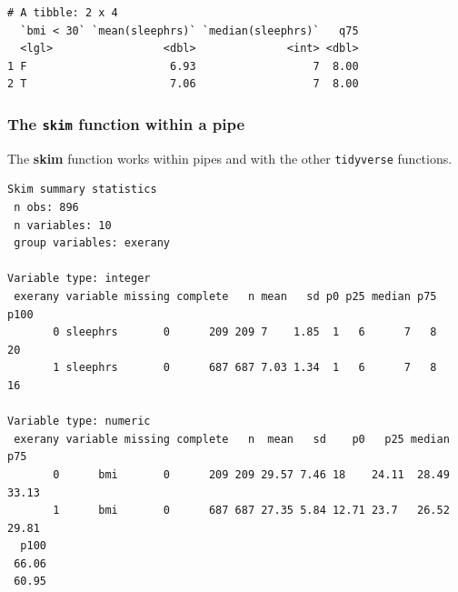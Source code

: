 \documentclass[]{book}
\newenvironment{Shaded}{\begin{snugshade}}{\end{snugshade}}
\newcommand{\KeywordTok}[1]{\textcolor[rgb]{0.13,0.29,0.53}{\textbf{#1}}}
\newcommand{\DataTypeTok}[1]{\textcolor[rgb]{0.13,0.29,0.53}{#1}}
\newcommand{\StringTok}[1]{\textcolor[rgb]{0.31,0.60,0.02}{#1}}
\newcommand{\OtherTok}[1]{\textcolor[rgb]{0.56,0.35,0.01}{#1}}
\newcommand{\OperatorTok}[1]{\textcolor[rgb]{0.81,0.36,0.00}{\textbf{#1}}}
\newcommand{\NormalTok}[1]{#1}
\theoremstyle{definition}
\theoremstyle{definition}
\theoremstyle{definition}
\theoremstyle{remark}
\begin{document}
\begin{verbatim}
# A tibble: 2 x 4
  `bmi < 30` `mean(sleephrs)` `median(sleephrs)`   q75
  <lgl>                 <dbl>              <int> <dbl>
1 F                      6.93                  7  8.00
2 T                      7.06                  7  8.00
\end{verbatim}

\subsubsection{\texorpdfstring{The \texttt{skim} function within a
pipe}{The skim function within a pipe}}\label{the-skim-function-within-a-pipe}

The \textbf{skim} function works within pipes and with the other
\texttt{tidyverse} functions.

\begin{Shaded}
\end{Shaded}

\begin{verbatim}
Skim summary statistics
 n obs: 896 
 n variables: 10 
 group variables: exerany 

Variable type: integer 
 exerany variable missing complete   n mean   sd p0 p25 median p75 p100
       0 sleephrs       0      209 209 7    1.85  1   6      7   8   20
       1 sleephrs       0      687 687 7.03 1.34  1   6      7   8   16

Variable type: numeric 
 exerany variable missing complete   n  mean   sd    p0   p25 median   p75
       0      bmi       0      209 209 29.57 7.46 18    24.11  28.49 33.13
       1      bmi       0      687 687 27.35 5.84 12.71 23.7   26.52 29.81
  p100
 66.06
 60.95
\end{verbatim}
\end{document}
